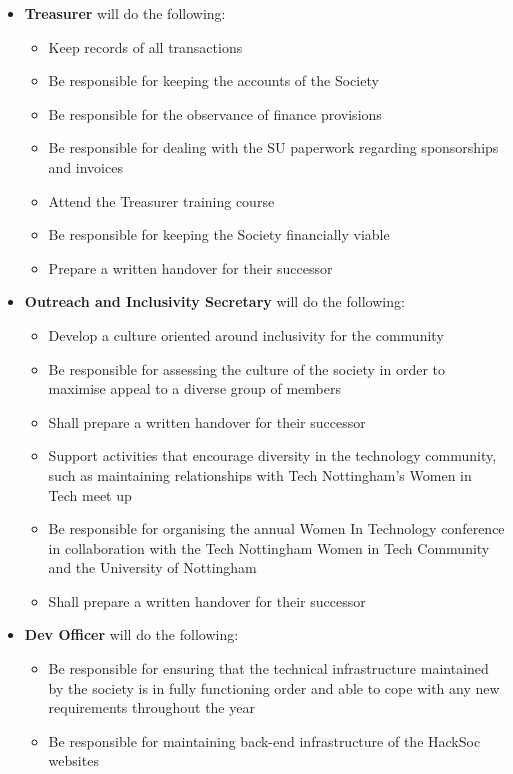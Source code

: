 \documentclass[a4paper,twoside,notitlepage,11pt]{article}
\begin{document}
\begin{itemize}
\begin{itemize}
	\end{itemize}
	\item \textbf{Treasurer} will do the following:
	\begin{itemize}
	  \item Keep records of all transactions
	  \item Be responsible for keeping the accounts of the Society
	  \item Be responsible for the observance of finance provisions
	  \item Be responsible for dealing with the SU paperwork regarding sponsorships and invoices
	  \item Attend the Treasurer training course
	  \item Be responsible for keeping the Society financially viable
	  \item Prepare a written handover for their successor
	\end{itemize}
	\item \textbf{Outreach and Inclusivity Secretary} will do the following:
	\begin{itemize} 
	  \item Develop a culture oriented around inclusivity for the community
	  \item Be responsible for assessing the culture of the society in order to maximise appeal to a diverse group of members
	  \item Shall prepare a written handover for their successor
	  \item Support activities that encourage diversity in the technology community, such as maintaining relationships with Tech Nottingham’s Women in Tech meet up
	  \item Be responsible for organising the annual Women In Technology conference in collaboration with the Tech Nottingham Women in Tech Community and the University of Nottingham
	  \item Shall prepare a written handover for their successor
	\end{itemize}
	\item \textbf{Dev Officer} will do the following: 
	\begin{itemize}
	  \item Be responsible for ensuring that the technical infrastructure maintained by the society is in fully functioning order and able to cope with any new requirements throughout the year
	  \item Be responsible for maintaining back-end infrastructure of the HackSoc websites

\end{itemize}
\end{itemize}
\end{document}
